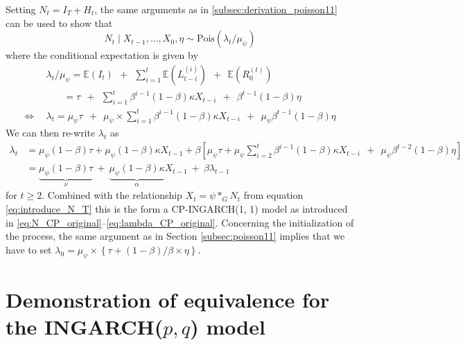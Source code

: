 \documentclass[review]{elsarticle}
\begin{document}
Setting $N_t = I_T + H_t$, the same arguments as in \eqref{subsec:derivation_poisson11} can be used to show that
$$
N_t \mid X_{t - 1}, \dots, X_0, \eta \sim \text{Pois}(\lambda_t/\mu_\psi)
$$
where the conditional expectation is given by
\begin{align*}
& \lambda_t/\mu_\psi = \mathbb{E}(I_t) \ \ + \ \ \sum_{i = 1}^t \mathbb{E}(L_{t - i}^{(i)}) \ \ + \ \ \mathbb{E}(R_0^{(t)})\\
& \ \ \ \ \ \ \ \ = \tau \ \ + \ \ \sum_{i = 1}^t \beta^{i - 1}(1 - \beta)\kappa X_{t - i} \ \ + \ \ \beta^{t - 1}(1 - \beta)\eta\\
\Leftrightarrow \ \ & \lambda_t = \mu_\psi \tau \ \ + \ \ \mu_\psi \times \sum_{i = 1}^t \beta^{i - 1}(1 - \beta)\kappa X_{t - i} \ \ + \ \ \mu_\psi\beta^{t - 1}(1 - \beta)\eta
\end{align*}
We can then re-write $\lambda_t$ as
\begin{align*}
\lambda_t & = \mu_\psi(1 - \beta)\tau + \mu_\psi(1 - \beta)\kappa X_{t - 1} + \beta \left[\mu_\psi\tau +   \mu_\psi \sum_{i = 2}^t \beta^{i - 1}(1 - \beta)\kappa X_{t - i}  \ \ + \ \ \mu_\psi\beta^{t - 2}(1 - \beta)\eta\right]\\
& = \underbrace{\mu_\psi(1 - \beta)\tau}_{\nu} \ + \ \underbrace{\mu_\psi(1 - \beta)\kappa}_{\alpha} X_{t - 1} \ + \ \beta \lambda_{t - 1}
\end{align*}
for $t \geq 2$. Combined with the relationship $X_t = \psi *_G N_t$ from equation \eqref{eq:introduce_N_T} this is the form a CP-INGARCH(1, 1) model as introduced in \eqref{eq:N_CP_original}--\eqref{eq:lambda_CP_original}. Concerning the initialization of the process, the same argument as in Section \ref{subsec:poisson11} implies that we have to set $\lambda_0 = \mu_\psi\times \left\{\tau + (1 - \beta)/\beta \times \eta\right\}$.







\newpage

\section{Demonstration of equivalence for the INGARCH($p, q$) model}
\end{document}
